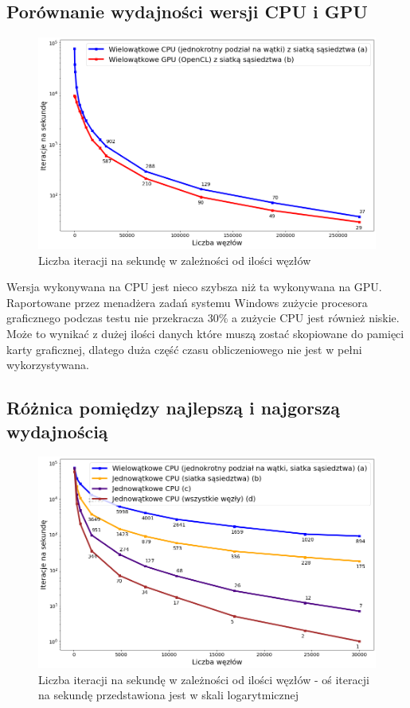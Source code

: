 \documentclass[12pt, letterpaper]{report}
\begin{document}
    \subsection{Porównanie wydajności wersji CPU i GPU}
    \begin{figure}[H]
        \centering
        \includegraphics[width=18cm]{performance_best_cpu_gpu.png}
        \caption{
            Liczba iteracji na sekundę w zależności od ilości węzłów
        }
    \end{figure}
    Wersja wykonywana na CPU jest nieco szybsza niż ta wykonywana na GPU.
    Raportowane przez menadżera zadań systemu Windows zużycie procesora graficznego podczas testu
    nie przekracza $30\%$ a zużycie CPU jest również niskie. Może to wynikać z 
    dużej ilości danych które muszą zostać skopiowane do pamięci karty graficznej, dlatego 
    duża część czasu obliczeniowego nie jest w pełni wykorzystywana.

    \subsection{Różnica pomiędzy najlepszą i najgorszą wydajnością}
    \begin{figure}[H]
        \centering
        \includegraphics[width=16cm]{performance_all_best_worst.png}
        \caption{
            Liczba iteracji na sekundę w zależności od ilości węzłów -
            oś iteracji na sekundę przedstawiona jest w skali logarytmicznej
        }
    \end{figure}
\end{document}
